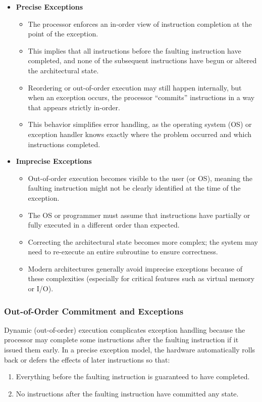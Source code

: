 \begin{itemize}
  \item \textbf{Precise Exceptions}
  \begin{itemize}
    \item The processor enforces an in-order view of instruction completion at the point of the exception.
    \item This implies that all instructions before the faulting instruction have completed, and none of the subsequent instructions have begun or altered the architectural state.
    \item Reordering or out-of-order execution may still happen internally, but when an exception occurs, the processor ``commits'' instructions in a way that appears strictly in-order.
    \item This behavior simplifies error handling, as the operating system (OS) or exception handler knows exactly where the problem occurred and which instructions completed.
  \end{itemize}
  \item \textbf{Imprecise Exceptions}
  \begin{itemize}
    \item Out-of-order execution becomes visible to the user (or OS), meaning the faulting instruction might not be clearly identified at the time of the exception.
    \item The OS or programmer must assume that instructions have partially or fully executed in a different order than expected.
    \item Correcting the architectural state becomes more complex; the system may need to re-execute an entire subroutine to ensure correctness.
    \item Modern architectures generally avoid imprecise exceptions because of these complexities (especially for critical features such as virtual memory or I/O).
  \end{itemize}
\end{itemize}

\subsubsection{Out-of-Order Commitment and Exceptions}
Dynamic (out-of-order) execution complicates exception handling because the processor may complete some instructions after the faulting instruction if it issued them early. In a precise exception model, the hardware automatically rolls back or defers the effects of later instructions so that:
%
\begin{enumerate}
  \item Everything before the faulting instruction is guaranteed to have completed.
  \item No instructions after the faulting instruction have committed any state.
\end{enumerate}

